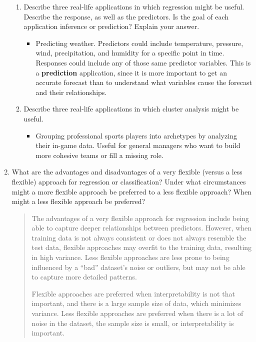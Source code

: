 \documentclass[11pt]{article}
\newenvironment{answer}{
\begin{quote}}{
\end{quote}}
\begin{document}
\begin{enumerate}
\begin{enumerate}
      \item Describe three real-life applications in which regression might
        be useful. Describe the response, as well as the predictors. Is the
        goal of each application inference or prediction? Explain your
        answer.
        \begin{itemize}
          \item Predicting weather. Predictors could include
            temperature, pressure, wind, precipitation, and humidity
            for a specific point in time. Responses could include any
            of those same predictor variables. This is a
            \textbf{prediction} application, since it is more
            important to get an accurate forecast than to understand
            what variables cause the forecast and their relationships.
        \end{itemize}
      \item Describe three real-life applications in which cluster analysis
        might be useful.
        \begin{itemize}
          \item Grouping professional sports players into archetypes
            by analyzing their in-game data. Useful for general
            managers who want to build more cohesive teams or fill a
            missing role.
        \end{itemize}
    \end{enumerate}

  \item What are the advantages and disadvantages of a very flexible (versus
    a less flexible) approach for regression or classification? Under what
    circumstances might a more flexible approach be preferred to a less
    flexible approach? When might a less flexible approach be preferred?
    \begin{answer}
      The advantages of a very flexible approach for regression
      include being able to capture deeper relationships between
      predictors. However, when training data is not always
      consistent or does not always resemble the test data, flexible
      approaches may overfit to the training data, resulting in high
      variance. Less flexible approaches are less prone to being
      influenced by a ``bad'' dataset's noise or outliers, but may
      not be able to capture more detailed patterns.

      Flexible approaches are preferred when interpretability is not
      that important, and there is a large sample size of data, which
      minimizes variance. Less flexible approaches are preferred when
      there is a lot of noise in the dataset, the sample size is
      small, or interpretability is important.
    \end{answer}


\end{enumerate}
\end{document}
